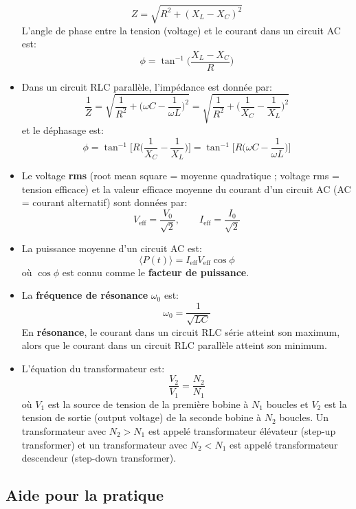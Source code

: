 \documentclass[a4paper]{article}
\begin{document}
\begin{itemize}
\[ Z = \sqrt{R^2 + (X_L - X_C)^2} \]
L'angle de phase entre la tension (voltage) et le courant dans un circuit AC est: 
\[ \phi = \tan^{-1} \Big( \frac{X_L - X_C}{R} \Big) \]
    \item Dans un circuit RLC parallèle, l'impédance est donnée par:
\[ \frac{1}{Z} = \sqrt{ \frac{1}{R^2} + \Big( \omega C - \frac{1}{\omega L} \Big)^2 } = \sqrt{ \frac{1}{R^2} + \Big( \frac{1}{X_C} - \frac{1}{X_L} \Big)^2 } \]
et le déphasage est: 
\[ \phi = \tan^{-1} \Big[ R \Big( \frac{1}{X_C} - \frac{1}{X_L} \Big) \Big] = \tan^{-1} \Big[ R \Big( \omega C - \frac{1}{\omega L} \Big) \Big] \]
    \item Le voltage \textbf{rms} (root mean square = moyenne quadratique ; voltage rms = tension efficace) et la valeur efficace moyenne
du courant d'un circuit AC (AC = courant alternatif) sont données par: 
\[ V_{\text{eff}} = \frac{V_0}{\sqrt{2}}, \qquad I_{\text{eff}} = \frac{I_0}{\sqrt{2}} \]
    \item La puissance moyenne d'un circuit AC est: 
\[ \langle P(t) \rangle = I_{\text{eff}} V_{\text{eff}} \cos \phi \]
où $ \cos \phi $ est connu comme le \textbf{facteur de puissance}.
    \item La \textbf{fréquence de résonance} $ \omega_0 $ est: \[ \omega_0 = \frac{1}{\sqrt{LC}} \]
En \textbf{résonance}, le courant dans un circuit RLC série atteint son maximum, alors que le courant dans un circuit RLC parallèle atteint son minimum.
    \item L'équation du transformateur est: \[ \frac{V_2}{V_1} = \frac{N_2}{N_1} \]
où $ V_1 $ est la source de tension de la première bobine à $ N_1 $ boucles et $ V_2 $ est la tension de sortie (output voltage) de la seconde bobine à $ N_2 $ boucles. Un transformateur avec $ N_2 > N_1 $ est appelé transformateur élévateur (step-up transformer) et un transformateur avec $ N_2 < N_1 $ est appelé transformateur descendeur (step-down transformer).
\end{itemize}












\subsection{Aide pour la pratique}
\end{document}
